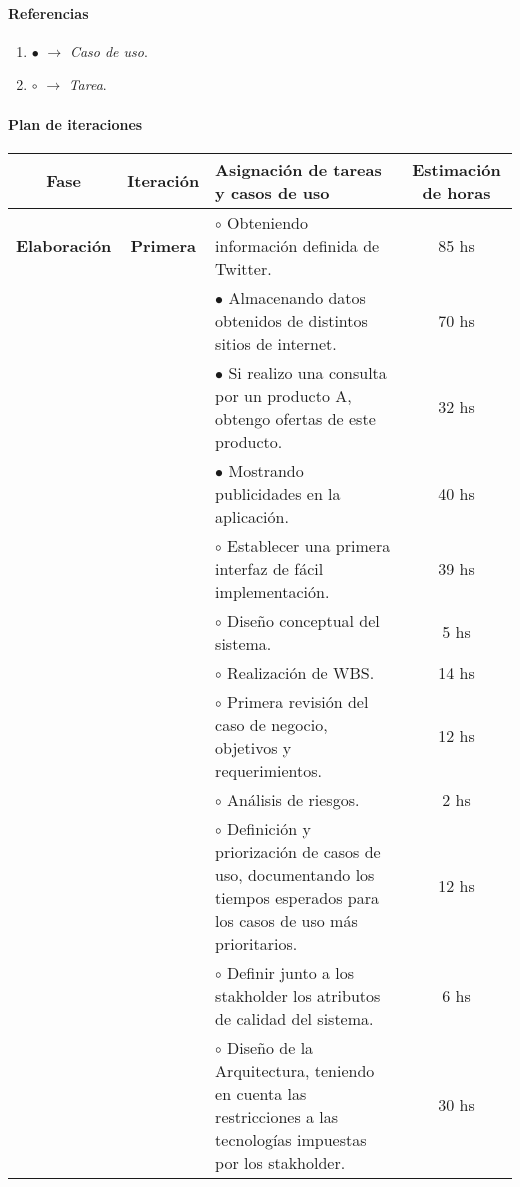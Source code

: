
\paragraph{Referencias}
\begin{enumerate}
	\item $\bullet$ $\rightarrow$ \textit{Caso de uso}.
	\item $\circ$ $\rightarrow$ \textit{Tarea}.
\end{enumerate}


\newpage

\paragraph{Plan de iteraciones}
\begin{center}

	\begin{tabular}{| c | c | p{10cm} | c |}
    \hline
    \textbf{Fase} & \textbf{Iteración} & \textbf{Asignación de tareas y casos de uso} & \textbf{Estimación de horas} \\
		\hline
		\textbf{Elaboración} & \textbf{Primera}& $\circ$ Obteniendo información definida de Twitter. & 85 hs  \\
								& & $\bullet$ Almacenando datos obtenidos de distintos sitios de internet. & 70 hs \\
								& & $\bullet$ Si realizo una consulta por un producto A, obtengo ofertas de este producto. & 32 hs \\
								& & $\bullet$ Mostrando publicidades en la aplicación. & 40 hs \\
								& & $\circ$ Establecer una primera interfaz de fácil implementación. & 39 hs \\
								& & $\circ$ Diseño conceptual del sistema. & 5 hs \\ 
								& & $\circ$ Realización de WBS. & 14 hs \\
								& & $\circ$ Primera revisión del caso de negocio, objetivos y requerimientos. & 12 hs \\
								& & $\circ$ Análisis de riesgos. & 2 hs \\
								& & $\circ$ Definición y priorización de casos de uso, documentando los tiempos esperados para los casos de uso más prioritarios. & 12 hs \\
								& & $\circ$ Definir junto a los stakholder los atributos de calidad del sistema. & 6 hs \\
								& & $\circ$ Diseño de la Arquitectura, teniendo en cuenta las restricciones a las tecnologías impuestas por los stakholder. & 30 hs \\


\end{tabular}
\end{center}
